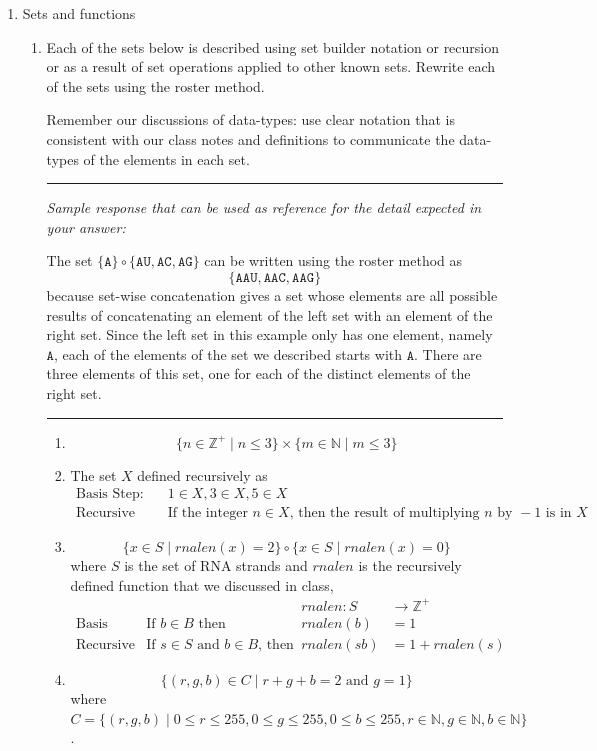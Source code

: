 \documentclass[12pt, oneside]{article}
\newcommand{\A}[0]{\texttt{A}}
\newcommand{\C}[0]{\texttt{C}}
\newcommand{\G}[0]{\texttt{G}}
\newcommand{\U}[0]{\texttt{U}}
\begin{document}
\begin{enumerate}[labelindent=0pt, leftmargin=0pt]
    \item Sets and functions
    \begin{enumerate}
        \item Each of the sets below is described 
using set builder notation or recursion or as a result of set operations
applied to other known sets.  Rewrite each of the sets using the roster method.

Remember our discussions of data-types: use clear notation that 
is consistent with our class notes and definitions 
to communicate the data-types of the elements in each set.


\rule{0.5\textwidth}{.4pt}

{\it Sample response that can be used as reference for the detail expected 
in your answer:} 

The set $\{ \A \} \circ \{ \A\U, \A\C, \A\G\}$ can be written using
the roster method as 
\[
\{ \A\A\U, \A\A\C, \A\A\G \}
\]
because set-wise concatenation gives a set whose elements are 
all possible results of concatenating an element of the 
left set with an 
element of the right set. Since the left set in this example only
has one element, namely $\A$, each of the elements of the set we 
described starts with $\A$. There are three elements of this set, 
one for each of the distinct elements of the right set.

\rule{0.5\textwidth}{.4pt}

\begin{enumerate}
\item $$\{ n \in \mathbb{Z}^+ \mid n \leq 3 \} \times \{ m \in \mathbb{N} \mid m \leq 3\}$$
\item The set $X$ defined recursively as 
    \[
    \begin{array}{ll}
    \textrm{Basis Step: } & 1 \in X, 3 \in X, 5 \in X \\
    \textrm{Recursive Step: } & \textrm{If the integer } n \in X \textrm{, then the result of multiplying } n \textrm{ by } -1 \textrm{ is in }X
    \end{array}
    \]
\item $$\{ x \in S \mid rnalen(x) = 2 \} \circ \{x \in S \mid rnalen(x) = 0 \}$$
where $S$ is the set of RNA strands and $rnalen$ is the recursively defined
function that we discussed in class,
\[
\begin{array}{llll}
& & \textit{rnalen} : S & \to \mathbb{Z}^+ \\
\textrm{Basis Step:} & \textrm{If } b \in B\textrm{ then } & \textit{rnalen}(b) & = 1 \\
\textrm{Recursive Step:} & \textrm{If } s \in S\textrm{ and }b \in B\textrm{, then  } & \textit{rnalen}(sb) & = 1 + \textit{rnalen}(s)
\end{array}
\]
\item $$\{ (r,g,b) \in C \mid r+g+b = 2 \textrm{ and } g=1\}$$ where 
$C = \{ (r,g,b) \mid 0 \leq r \leq 255, 0 \leq g \leq 255, 0 \leq b \leq 255, r \in \mathbb{N}, g \in \mathbb{N}, b \in \mathbb{N} \}$.
\end{enumerate}


\end{enumerate}
\end{enumerate}
\end{document}
